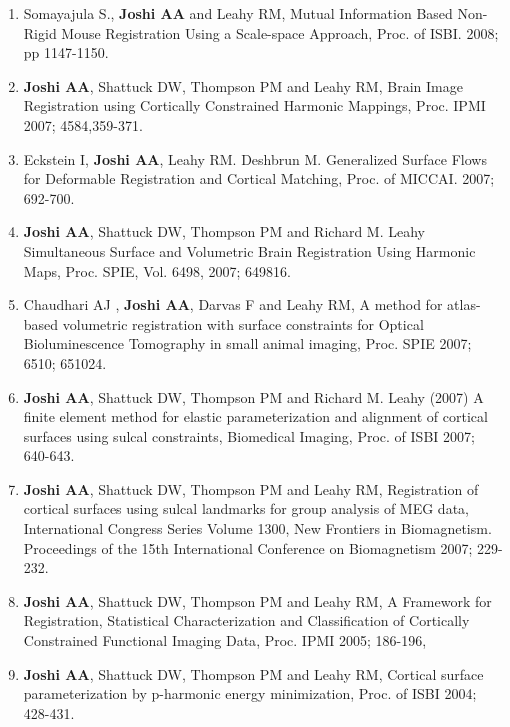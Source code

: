 \documentclass[overlapped,line,letterpaper]{res}
\begin{document}
\begin{resume}
\begin{enumerate}
    \item Somayajula S., \textbf{Joshi AA}  and Leahy RM, {Mutual Information Based Non-Rigid Mouse Registration Using a  Scale-space Approach}, Proc. of ISBI. 2008; pp 1147-1150. 

    \item \textbf{Joshi AA}, Shattuck DW, Thompson PM and Leahy RM, {Brain Image Registration using Cortically Constrained Harmonic Mappings}, Proc. IPMI 2007; 4584,359-371.

    \item Eckstein I, \textbf{Joshi AA}, Leahy RM. Deshbrun M. {Generalized Surface Flows for Deformable Registration and Cortical Matching}, Proc. of MICCAI. 2007; 692-700.

    \item \textbf{Joshi AA}, Shattuck DW, Thompson PM and Richard M. Leahy {Simultaneous Surface and Volumetric Brain Registration Using Harmonic Maps}, Proc. SPIE, Vol. 6498, 2007; 649816.

    \item Chaudhari AJ , \textbf{Joshi AA}, Darvas F and Leahy RM, {A method for atlas-based volumetric registration with surface constraints for Optical Bioluminescence Tomography in small animal imaging}, Proc. SPIE 2007; 6510; 651024.

    \item \textbf{Joshi AA}, Shattuck DW, Thompson PM and Richard M. Leahy (2007) {A finite element method for elastic parameterization and alignment of cortical surfaces using sulcal constraints, Biomedical Imaging}, Proc. of ISBI 2007; 640-643. 

    \item \textbf{Joshi AA}, Shattuck DW, Thompson PM and Leahy RM, {Registration of cortical surfaces using sulcal landmarks for group analysis of MEG data}, International Congress Series Volume 1300, New Frontiers in Biomagnetism. Proceedings of the 15th International Conference on Biomagnetism 2007; 229-232.

    \item \textbf{Joshi AA}, Shattuck DW, Thompson PM and Leahy RM, {A Framework for Registration, Statistical Characterization and Classification of Cortically Constrained Functional Imaging Data}, Proc. IPMI 2005;  186-196,

    \item \textbf{Joshi AA}, Shattuck DW, Thompson PM and Leahy RM, {Cortical surface parameterization by p-harmonic energy minimization}, Proc. of ISBI 2004; 428-431.
\end{enumerate}


\end{resume}
\end{document}
